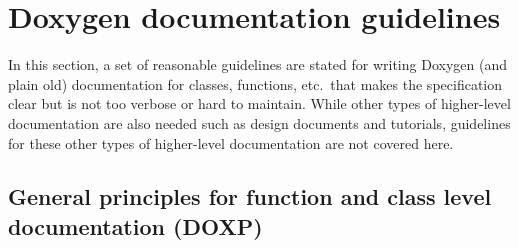 %
\section{Doxygen documentation guidelines}
\label{sec:DocumentionGuidelines}
%

In this section, a set of reasonable guidelines are stated for writing Doxygen
(and plain old) documentation for classes, functions, etc.\ that makes the
specification clear but is not too verbose or hard to maintain.  While other
types of higher-level documentation are also needed such as design documents
and tutorials, guidelines for these other types of higher-level documentation
are not covered here.


%
\subsection{General principles for function and class level documentation (DOXP)}
%


